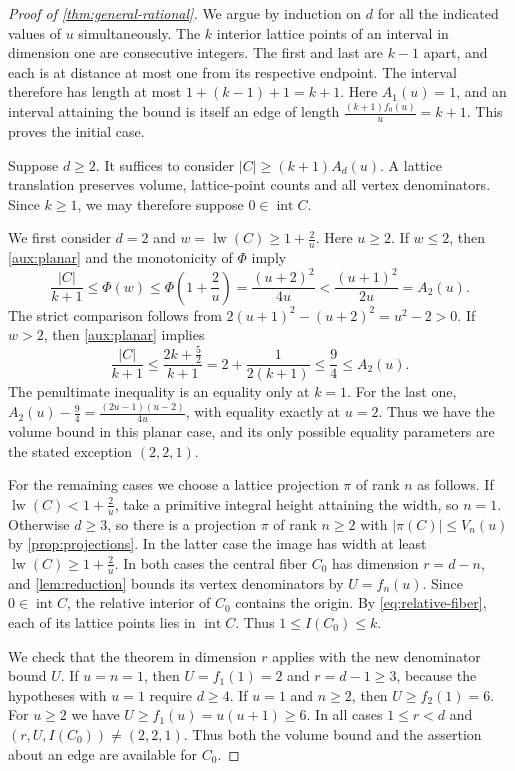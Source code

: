 \documentclass[reqno, 11pt]{article}
\numberwithin{equation}{section}
\theoremstyle{definition}
\DeclareMathOperator{\lw}{lw}
\DeclareMathOperator{\intr}{int}
\begin{document}
\begin{proof}[Proof of \cref{thm:general-rational}]
We argue by induction on $d$ for all the indicated values of $u$
simultaneously. The $k$ interior lattice points of an interval in
dimension one are consecutive integers. The first and last are $k-1$ apart,
and each is at distance at most one from its respective endpoint.
The interval therefore has length at most $1+(k-1)+1=k+1$. Here $A_1(u)=1$, and an interval
attaining the bound is itself an edge of length
$\frac{(k+1)f_0(u)}{u}=k+1$. This proves the initial case.

Suppose $d\ge2$. It suffices to consider $|C|\ge(k+1)A_d(u)$.
A lattice translation preserves volume, lattice-point counts and all
vertex denominators. Since $k\ge1$, we may therefore suppose
$0\in\intr C$.

We first consider $d=2$ and $w=\lw(C)\ge1+\frac{2}{u}$. Here
$u\ge2$. If $w\le2$, then \cref{aux:planar} and the monotonicity
of $\Phi$ imply
\[
 \frac{|C|}{k+1}\le\Phi(w)\le\Phi\left(1+\frac{2}{u}\right)
 =\frac{(u+2)^2}{4u}<\frac{(u+1)^2}{2u}=A_2(u).
\]
The strict comparison follows from
$2(u+1)^2-(u+2)^2=u^2-2>0$. If $w>2$, then \cref{aux:planar}
implies
\[
 \frac{|C|}{k+1}\le\frac{2k+\frac{5}{2}}{k+1}
 =2+\frac{1}{2(k+1)}\le\frac{9}{4}\le A_2(u).
\]
The penultimate inequality is an equality only at $k=1$.
For the last one,
$A_2(u)-\frac{9}{4}=\frac{(2u-1)(u-2)}{4u}$, with equality exactly at
$u=2$. Thus we have the volume bound in this planar case, and its
only possible equality parameters are the stated exception $(2,2,1)$.

For the remaining cases we choose a lattice projection $\pi$ of rank
$n$ as follows. If $\lw(C)<1+\frac{2}{u}$, take a primitive integral height
attaining the width, so $n=1$. Otherwise $d\ge3$, so there is a projection $\pi$ of rank $n\ge2$ with
$|\pi(C)|\le V_n(u)$ by \cref{prop:projections}.
In the latter case the image has width at least $\lw(C)\ge1+\frac{2}{u}$. In both cases the central fiber $C_0$ has dimension $r=d-n$,
and \cref{lem:reduction} bounds its vertex denominators by $U=f_n(u)$.
Since $0\in\intr C$, the relative interior of $C_0$ contains the
origin. By \eqref{eq:relative-fiber}, each of its lattice points lies
in $\intr C$. Thus $1\le I(C_0)\le k$.

We check that the theorem in dimension $r$ applies with the new
denominator bound $U$. If $u=n=1$, then $U=f_1(1)=2$ and $r=d-1\ge3$,
because the hypotheses with $u=1$ require $d\ge4$. If $u=1$ and
$n\ge2$, then $U\ge f_2(1)=6$. For $u\ge2$ we have
$U\ge f_1(u)=u(u+1)\ge6$. In all cases $1\le r<d$ and
$(r,U,I(C_0))\ne(2,2,1)$. Thus both the volume bound and the
assertion about an edge are available for $C_0$.


\end{proof}
\end{document}
